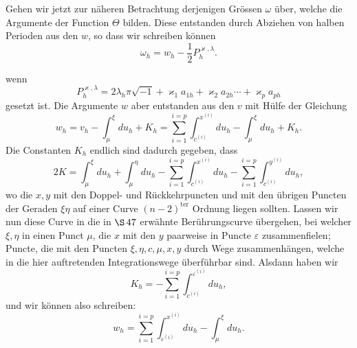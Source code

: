 \documentclass[10pt]{article}
\begin{document}
Gehen wir jetzt zur näheren Betrachtung derjenigen Grössen \(\omega\) über, welche die Argumente der Function \(\Theta\) bilden. Diese entstanden durch Abziehen von halben Perioden aus den \(w\), so dass wir schreiben können
\[
\tag{1}\omega_h=w_h-\frac12P_h^{\varkappa,\lambda}.
\]


wenn
\[
P_h^{\varkappa,\lambda}=2\lambda_h\pi\sqrt{-1}+\varkappa_1a_{1h}+\varkappa_2a_{2h}\cdots+\varkappa_pa_{ph}
\]
gesetzt ist. Die Argumente \(w\) aber entstanden aus den \(v\) mit Hülfe der Gleichung
\[
w_h=v_h-\int_{\mu}^{\xi}du_h+K_h
=\sum_{i=1}^{i=p}\int_{c^{(i)}}^{x^{(i)}}du_h-\int_{\mu}^{\xi}du_h+K_h.
\]
Die Constanten \(K_h\) endlich sind dadurch gegeben, dass
\[
2K=\int_{\mu}^{\xi}du_h+\int_{\mu}^{\eta}du_h
-\sum_{i=1}^{i=p}\int_{c^{(i)}}^{x^{(i)}}du_h
-\sum_{i=1}^{i=p}\int_{c^{(i)}}^{y^{(i)}}du_h,
\]
wo die \(x,y\) mit den Doppel- und Rückkehrpuncten und mit den übrigen Puncten der Geraden \(\xi\eta\) auf einer Curve \((n-2)^{\text{ter}}\) Ordnung liegen sollten. Lassen wir nun diese Curve in die in \(\S\,47\) erwähnte Berührungscurve übergehen, bei welcher \(\xi,\eta\) in einen Punct \(\mu\), die \(x\) mit den \(y\) paarweise in Puncte \(\varepsilon\) zusammenfielen; Puncte, die mit den Puncten \(\xi,\eta,c,\mu,x,y\) durch Wege zusammenhängen, welche in die hier auftretenden Integrationswege überführbar sind. Alsdann haben wir
\[
K_h=-\sum_{i=1}^{i=p}\int_{c^{(i)}}^{\varepsilon^{(i)}}du_h,
\]
und wir können also schreiben:
\[
\tag{2}w_h=\sum_{i=1}^{i=p}\int_{\varepsilon^{(i)}}^{x^{(i)}}du_h-\int_{\mu}^{\xi}du_h.
\]
\end{document}
